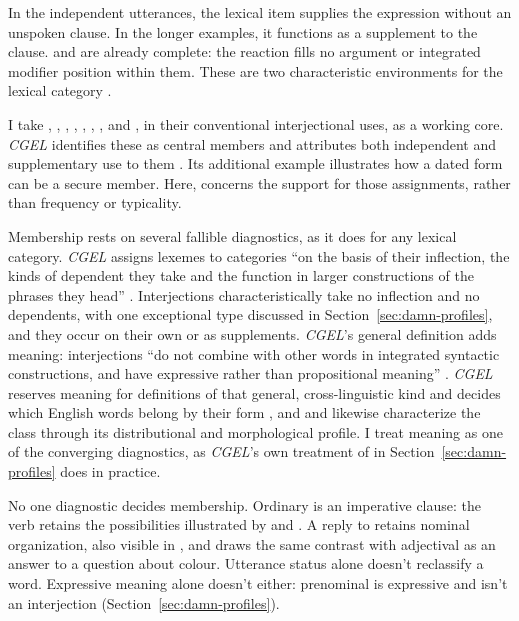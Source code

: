 \documentclass[12pt]{article}
\begin{document}
In the independent utterances, the lexical item supplies the expression
without an unspoken clause. In the longer examples, it functions as
a supplement to the clause.  and  are already complete: the reaction fills no argument or integrated
modifier position within them. These are two characteristic environments
for the lexical category .

I take , , , ,
, , , and , in their
conventional interjectional uses, as a working core. \textit{CGEL}
identifies these as central members and attributes both independent and
supplementary use to them \citep[1361]{HuddlestonPullum2002}. Its
additional example  illustrates how a dated form can be a
secure member. Here,  concerns the support for those
assignments, rather than frequency or typicality.

Membership rests on several fallible diagnostics, as it does for any
lexical category. \textit{CGEL} assigns lexemes to categories \enquote{on
the basis of their inflection, the kinds of dependent they take and the
function in larger constructions of the phrases they head}
\citep[30]{HuddlestonPullum2002}. Interjections characteristically take no
inflection \citep[106]{ameka1992} and no dependents, with one exceptional
type discussed in Section~\ref{sec:damn-profiles}, and they occur on their
own or as supplements. \textit{CGEL}'s general definition adds meaning:
interjections \enquote{do not combine with other words in integrated
syntactic constructions, and have expressive rather than propositional
meaning} \citep[1361]{HuddlestonPullum2002}. \textit{CGEL} reserves meaning
for definitions of that general, cross-linguistic kind and decides which
English words belong by their form \citep[31--32]{HuddlestonPullum2002},
and \textcite[105--106]{ameka1992} and \textcite[124--125]{wilkins1992}
likewise characterize the class through its distributional and
morphological profile. I treat meaning as one of the converging diagnostics,
as \textit{CGEL}'s own treatment of  in
Section~\ref{sec:damn-profiles} does in practice.

No one diagnostic decides membership. Ordinary  is an
imperative clause: the verb retains the possibilities illustrated by
 and . A reply 
to  retains nominal organization, also
visible in , and \textcite[124--125]{wilkins1992}
draws the same contrast with adjectival  as an answer to a
question about colour. Utterance status alone doesn't reclassify a word.
Expressive meaning alone doesn't either: prenominal  is
expressive and isn't an interjection (Section~\ref{sec:damn-profiles}).
\end{document}
